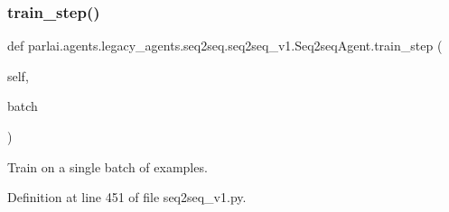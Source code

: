 \subsubsection{\texorpdfstring{train\+\_\+step()}{train\_step()}}
{\footnotesize\ttfamily def parlai.\+agents.\+legacy\+\_\+agents.\+seq2seq.\+seq2seq\+\_\+v1.\+Seq2seq\+Agent.\+train\+\_\+step (\begin{DoxyParamCaption}\item[{}]{self,  }\item[{}]{batch }\end{DoxyParamCaption})}

\begin{DoxyVerb}Train on a single batch of examples.
\end{DoxyVerb}
 

Definition at line 451 of file seq2seq\+\_\+v1.\+py.


